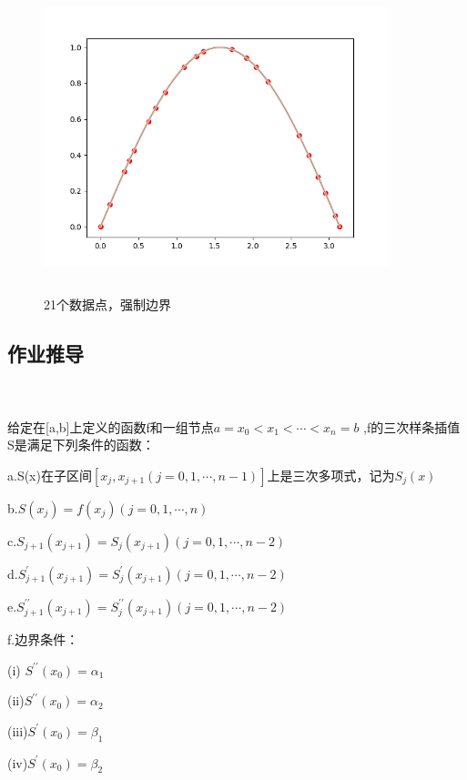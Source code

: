 \documentclass[UTF8]{ctexart}
\begin{document}
\begin{figure}[H]
 \centering
  \includegraphics[width=10cm,height=9cm]{4-3_21.png}
  \caption{21个数据点，强制边界}
\end{figure}
\newpage

\subsection{作业推导}

~\\
~\\

给定在[a,b]上定义的函数f和一组节点$a=x_{0}<x_{1}<\cdots<x_{n}=b$ ,f的三次样条插值S是满足下列条件的函数：

a.S(x)在子区间$ [x_j,x_{j+1}(j=0,1,\cdots ,n-1) ]$上是三次多项式，记为$S_j(x)$

b.$S\left(x_{j}\right)=f\left(x_{j}\right)(j=0,1, \cdots, n)$

c.$S_{j+1}\left(x_{j+1}\right)=S_{j}\left(x_{j+1}\right)(j=0,1, \cdots, n-2)$

d.$S_{j+1}^{\prime}\left(x_{j+1}\right)=S_{j}^{\prime}\left(x_{j+1}\right)(j=0,1, \cdots, n-2)$

e.$S_{j+1}^{\prime \prime}\left(x_{j+1}\right)=S_{j}^{\prime \prime}\left(x_{j+1}\right)(j=0,1, \cdots, n-2)$

f.边界条件：

\quad (i) $S^{\prime \prime}\left(x_{0}\right)=\alpha_1$

\quad (ii)$S^{\prime \prime}\left(x_{0}\right)=\alpha_2$

\quad (iii)$
S^{\prime}\left(x_{0}\right)=\beta_1
$


\quad (iv)$
S^{\prime}\left(x_{0}\right)=\beta_2
$
\end{document}
